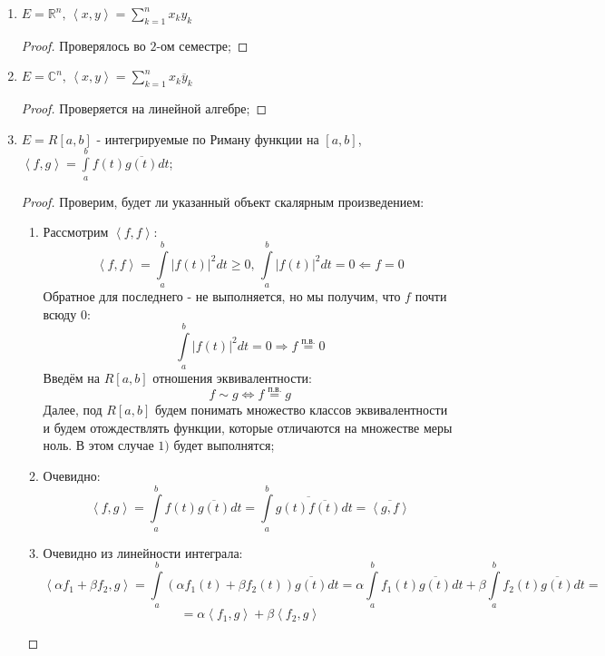 \documentclass[12pt]{article}
\newcommand{\MR}{\mathbb{R}}
\newcommand{\MC}{\mathbb{C}}
\theoremstyle{definition}
\newcommand{\ddsum}[2]{\displaystyle\sum\limits_{#1}^{#2}}
\newcommand{\ddint}[2]{\displaystyle\int\limits_{#1}^{#2}}
\newcommand{\inner}[2]{\left\langle #1, #2 \right\rangle }
\begin{document}
\begin{enumerate}[label=\arabic*)]
	\item $E = \MR^n, \, \inner{x}{y} = \ddsum{k = 1}{n}x_k y_k$
	\begin{proof}
		Проверялось во $2$-ом семестре;
	\end{proof}
	\item $E = \MC^n, \, \inner{x}{y} = \ddsum{k = 1}{n}x_k \overline{y}_k$
	\begin{proof}
		Проверяется на линейной алгебре;
	\end{proof} 
	\item $E = R[a,b]$ - интегрируемые по Риману функции на $[a,b]$, $\inner{f}{g} = \ddint{a}{b}f(t)\overline{g(t)}dt$;
	\begin{proof}
		Проверим, будет ли указанный объект скалярным произведением:
		\begin{enumerate}[label=\arabic*)]
			\item Рассмотрим $\inner{f}{f}$:
			$$
				\inner{f}{f} = \ddint{a}{b}|f(t)|^2dt \geq 0, \, \ddint{a}{b}|f(t)|^2dt = 0 \Leftarrow f = 0
			$$
			Обратное для последнего - не выполняется, но мы получим, что $f$ почти всюду $0$: 
			$$
				\ddint{a}{b}|f(t)|^2dt = 0 \Rightarrow f \overset{\text{п.в.}}{=} 0
			$$
			Введём на $R[a,b]$ отношения эквивалентности: 
			$$
				f \sim g \Leftrightarrow f \overset{\text{п.в.}}{=} g
			$$ 
			Далее, под $R[a,b]$ будем понимать множество классов эквивалентности и будем отождествлять функции, которые отличаются на множестве меры ноль. В этом случае $1)$ будет выполнятся;
			\item Очевидно:
			$$
				\inner{f}{g} = \ddint{a}{b}f(t)\overline{g(t)}dt = \ddint{a}{b}\overline{g(t) \overline{f(t)}}dt = \overline{\inner{g}{f}}
			$$
			\item Очевидно из линейности интеграла: 
			$$
				\inner{\alpha f_1 + \beta f_2}{g} = \ddint{a}{b}(\alpha f_1(t) + \beta f_2(t))\overline{g(t)}dt = \alpha \ddint{a}{b}f_1(t)\overline{g(t)}dt + \beta \ddint{a}{b}f_2(t)\overline{g(t)}dt =
			$$
			$$
				 = \alpha\inner{f_1}{g} + \beta\inner{f_2}{g}
			$$
		\end{enumerate}
	\end{proof}
\end{enumerate}
\end{document}

